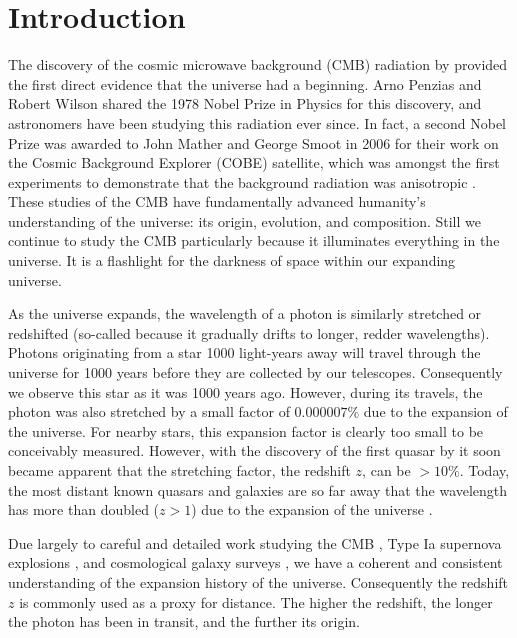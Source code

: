 \chapter{Introduction}

\begin{bibunit}

The discovery of the cosmic microwave background (CMB) radiation by \citet{1965ApJ...142..419P}
provided the first direct evidence that the universe had a beginning. Arno Penzias and Robert Wilson
shared the 1978 Nobel Prize in Physics for this discovery, and astronomers have been studying this
radiation ever since. In fact, a second Nobel Prize was awarded to John Mather and George Smoot in
2006 for their work on the Cosmic Background Explorer (COBE) satellite, which was amongst the first
experiments to demonstrate that the background radiation was anisotropic
\citep{1992ApJ...396L...1S}. These studies of the CMB have fundamentally advanced humanity's
understanding of the universe: its origin, evolution, and composition. Still we continue to study
the CMB particularly because it illuminates everything in the universe. It is a flashlight for the
darkness of space within our expanding universe.

As the universe expands, the wavelength of a photon is similarly stretched or redshifted (so-called
because it gradually drifts to longer, redder wavelengths). Photons originating from a star 1000
light-years away will travel through the universe for 1000 years before they are collected by our
telescopes. Consequently we observe this star as it was 1000 years ago. However, during its travels,
the photon was also stretched by a small factor of $0.000007\%$ due to the expansion of the
universe.  For nearby stars, this expansion factor is clearly too small to be conceivably measured.
However, with the discovery of the first quasar by \citet{1963Natur.197.1040S} it soon became
apparent that the stretching factor, the redshift $z$, can be $>10\%$. Today, the most distant known
quasars and galaxies are so far away that the wavelength has more than doubled ($z > 1$) due to the
expansion of the universe \citep{2011Natur.474..616M, 2015ApJ...810L..12Z, 2016ApJ...819..129O,
2018Natur.553..473B}.

Due largely to careful and detailed work studying the CMB \citep[e.g.,][]{2016A&A...594A..25P}, Type
Ia supernova explosions \citep[e.g.,][]{1998AJ....116.1009R,1999ApJ...517..565P}, and cosmological
galaxy surveys \citep[e.g.,][]{2001MNRAS.328.1039C}, we have a coherent and consistent understanding
of the expansion history of the universe. Consequently the redshift $z$ is commonly used as a proxy
for distance. The higher the redshift, the longer the photon has been in transit, and the further
its origin.


\end{bibunit}
